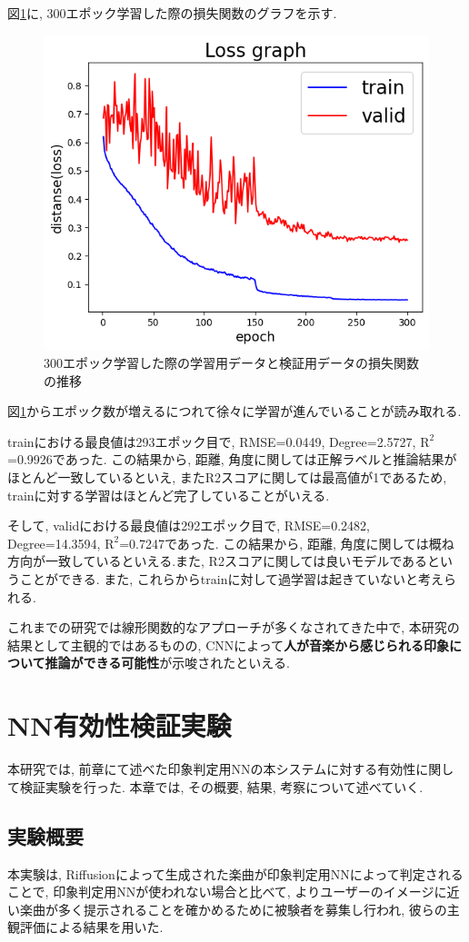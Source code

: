 \documentclass[a4paper,11pt,dvipdfmx]{jreport}
\begin{document}
図\ref{result}に, 300エポック学習した際の損失関数のグラフを示す.

\begin{figure}[htbp]
  \centering
  \includegraphics[width=0.8\linewidth]{graph.png}
  \caption{300エポック学習した際の学習用データと検証用データの損失関数の推移}
  \label{result}
\end{figure}

図\ref{result}からエポック数が増えるにつれて徐々に学習が進んでいることが読み取れる.

trainにおける最良値は293エポック目で, RMSE=0.0449, Degree=2.5727, $\mathrm{R^2}$=0.9926であった. この結果から, 距離, 角度に関しては正解ラベルと推論結果がほとんど一致しているといえ, またR2スコアに関しては最高値が1であるため, trainに対する学習はほとんど完了していることがいえる.

そして, validにおける最良値は292エポック目で, RMSE=0.2482, Degree=14.3594, $\mathrm{R^2}$=0.7247であった. この結果から, 距離, 角度に関しては概ね方向が一致しているといえる.また, R2スコアに関しては良いモデルであるということができる.
また, これらからtrainに対して過学習は起きていないと考えられる.

これまでの研究では線形関数的なアプローチが多くなされてきた中で, 本研究の結果として主観的ではあるものの, CNNによって\textbf{人が音楽から感じられる印象について推論ができる可能性}が示唆されたといえる.

\chapter{NN有効性検証実験}
本研究では, 前章にて述べた印象判定用NNの本システムに対する有効性に関して検証実験を行った.
本章では, その概要, 結果, 考察について述べていく.
\section{実験概要}
本実験は, Riffusionによって生成された楽曲が印象判定用NNによって判定されることで, 印象判定用NNが使われない場合と比べて, よりユーザーのイメージに近い楽曲が多く提示されることを確かめるために被験者を募集し行われ, 彼らの主観評価による結果を用いた.
\end{document}
